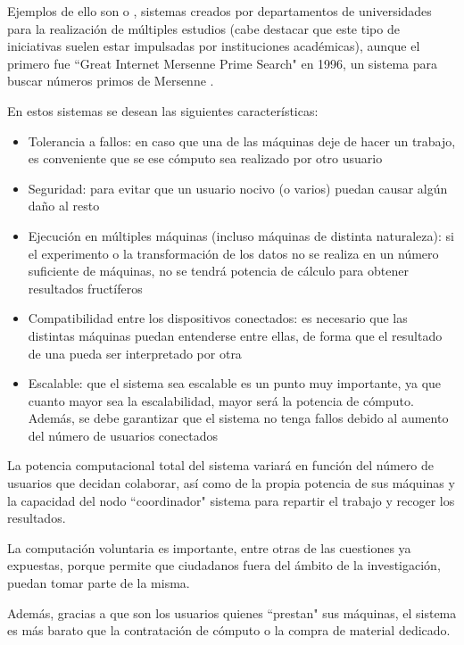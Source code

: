 \documentclass[runningheads,a4paper]{llncs}
\begin{document}
Ejemplos de ello son \cite{seti} o \cite{climate}, sistemas creados por
departamentos de universidades para la realizaci\'on de m\'ultiples estudios
(cabe destacar que este tipo de iniciativas suelen estar impulsadas por
instituciones acad\'emicas), aunque el primero fue ``Great Internet Mersenne Prime Search" en 1996,
un sistema para buscar n\'umeros primos de Mersenne \cite{gimps}.

En estos sistemas se desean las siguientes caracter\'isticas:
\begin{itemize}
  \item Tolerancia a fallos: en caso que una de las m\'aquinas deje de hacer un trabajo, es
  conveniente que se ese c\'omputo sea realizado por otro usuario
  \item Seguridad: para evitar que un usuario nocivo (o varios) puedan causar alg\'un da\~no
  al resto
  \item Ejecuci\'on en m\'ultiples m\'aquinas (incluso m\'aquinas de distinta naturaleza):
  si el experimento o la transformaci\'on de los datos no se realiza en un n\'umero suficiente
  de m\'aquinas, no se tendr\'a potencia de c\'alculo para obtener resultados fruct\'iferos
  \item Compatibilidad entre los dispositivos conectados: es necesario que
  las distintas m\'aquinas puedan entenderse entre ellas, de forma que el resultado
  de una pueda ser interpretado por otra
  \item Escalable: que el sistema sea escalable es un punto muy importante, ya que
  cuanto mayor sea la escalabilidad, mayor ser\'a la potencia de c\'omputo. Adem\'as,
  se debe garantizar que el sistema no tenga fallos debido al aumento del n\'umero de
  usuarios conectados
\end{itemize}

La potencia computacional total del sistema variar\'a en funci\'on del n\'umero de
usuarios que decidan colaborar, as\'i como de la propia potencia de sus m\'aquinas
y la capacidad del nodo ``coordinador" sistema para repartir el trabajo
y recoger los resultados.

La computaci\'on voluntaria es importante, entre otras de las cuestiones ya expuestas,
porque permite que ciudadanos fuera del \'ambito de la investigaci\'on, puedan
tomar parte de la misma.

Adem\'as, gracias a que son los usuarios quienes ``prestan" sus m\'aquinas, el sistema
es m\'as barato que la contrataci\'on de c\'omputo o la compra de material dedicado.
\end{document}
